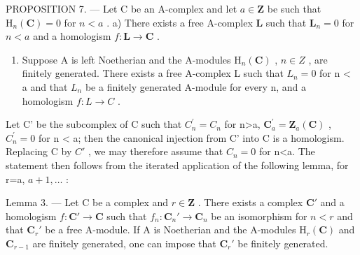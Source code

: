 PROPOSITION 7. --- Let C be an A-complex and let \(a \in \mathbf{Z}\) be such that \(\mathrm{H}_{n}(\mathbf{C}) = 0\) for \(n < a\) . a) There exists a free A-complex \(\mathbf{L}\) such that \(\mathbf{L}_{n} = 0\) for \(n < a\) and a homologism \(f: \mathbf{L} \to \mathbf{C}\) .

\begin{enumerate}
\def\labelenumi{\alph{enumi})}
\setcounter{enumi}{1}
\tightlist
\item
  Suppose A is left Noetherian and the A-modules \(\mathrm{H}_{n}(\mathbf{C})\) , \(n \in Z\) , are finitely generated. There exists a free A-complex L such that \(L_{n} = 0\) for n \textless{} a and that \(L_{n}\) be a finitely generated A-module for every n, and a homologism \(f: L \to C\) .
\end{enumerate}

Let C' be the subcomplex of C such that \(C_{n}^{\prime}=C_{n}\) for n\textgreater a, \(\mathbf{C}_{a}^{\prime}=\mathbf{Z}_{a}(\mathbf{C})\) , \(C_{n}^{\prime}=0\) for n \textless{} a; then the canonical injection from C' into C is a homologism. Replacing C by \(C'\) , we may therefore assume that \(C_{n}=0\) for n\textless a. The statement then follows from the iterated application of the following lemma, for r=a, \(a+1,\ldots\) :

Lemma 3. --- Let C be a complex and \(r \in \mathbf{Z}\) . There exists a complex \(\mathbf{C}'\) and a homologism \(f: \mathbf{C}' \to \mathbf{C}\) such that \(f_n: \mathbf{C}_n' \to \mathbf{C}_n\) be an isomorphism for \(n < r\) and that \(\mathbf{C}_r'\) be a free A-module. If A is Noetherian and the A-modules \(\mathrm{H}_r(\mathbf{C})\) and \(\mathbf{C}_{r-1}\) are finitely generated, one can impose that \(\mathbf{C}_r'\) be finitely generated.

